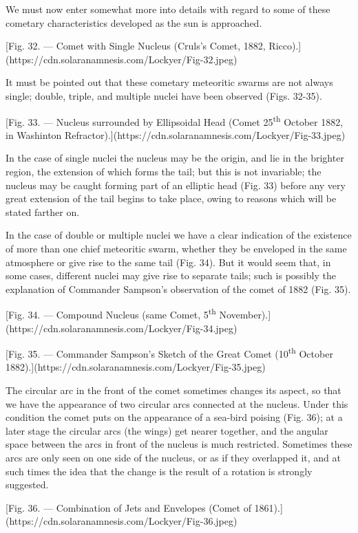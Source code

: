 \documentclass[a4paper, 12pt, oneside, polutonikogreek, english]{article}
\begin{document}
We must now enter somewhat more into details with regard to some of these cometary characteristics developed as the sun is approached.

[Fig. 32. --- Comet with Single Nucleus (Cruls's Comet, 1882, Ricco).](https://cdn.solaranamnesis.com/Lockyer/Fig-32.jpeg)

It must be pointed out that these cometary meteoritic swarms are not always single; double, triple, and multiple nuclei have been observed (Figs. 32-35).

[Fig. 33. --- Nucleus surrounded by Ellipsoidal Head (Comet 25\textsuperscript{th} October 1882, in Washinton Refractor).](https://cdn.solaranamnesis.com/Lockyer/Fig-33.jpeg)

In the case of single nuclei the nucleus may be the origin, and lie in the brighter region, the extension of which forms the tail; but this is not invariable; the nucleus may be caught forming part of an elliptic head (Fig. 33) before any very great extension of the tail begins to take place, owing to reasons which will be stated farther on.

In the case of double or multiple nuclei we have a clear indication of the existence of more than one chief meteoritic swarm, whether they be enveloped in the same atmosphere or give rise to the same tail (Fig. 34). But it would seem that, in some cases, different nuclei may give rise to separate tails; such is possibly the explanation of Commander Sampson's observation of the comet of 1882 (Fig. 35).

[Fig. 34. --- Compound Nucleus (same Comet, 5\textsuperscript{th} November).](https://cdn.solaranamnesis.com/Lockyer/Fig-34.jpeg)

[Fig. 35. --- Commander Sampson's Sketch of the Great Comet (10\textsuperscript{th} October 1882).](https://cdn.solaranamnesis.com/Lockyer/Fig-35.jpeg)

The circular arc in the front of the comet sometimes changes its aspect, so that we have the appearance of two circular arcs connected at the nucleus. Under this condition the comet puts on the appearance of a sea-bird poising (Fig. 36); at a later stage the circular arcs (the wings) get nearer together, and the angular space between the arcs in front of the nucleus is much restricted. Sometimes these arcs are only seen on one side of the nucleus, or as if they overlapped it, and at such times the idea that the change is the result of a rotation is strongly suggested.

[Fig. 36. --- Combination of Jets and Envelopes (Comet of 1861).](https://cdn.solaranamnesis.com/Lockyer/Fig-36.jpeg)
\end{document}

